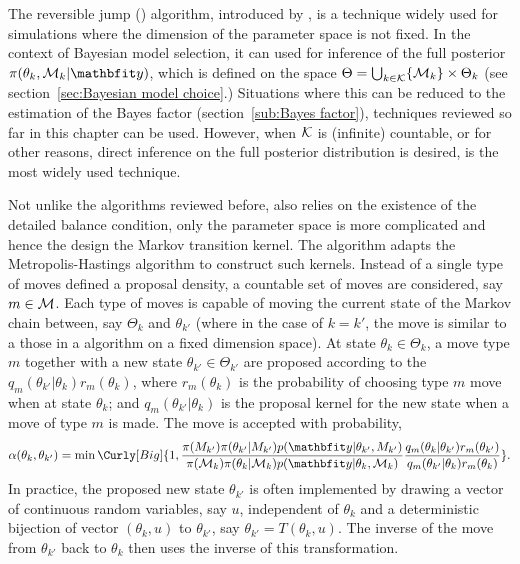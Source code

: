 The reversible jump \mcmc (\rjmcmc) algorithm, introduced by
\cite{Green:1995dg}, is a technique widely used for simulations where the
dimension of the parameter space is not fixed. In the context of Bayesian
model selection, it can used for inference of the full posterior
$\pi(\theta_k,\calM_k|\data)$, which is defined on the space $\Theta =
\bigcup_{k\in\mathcal{K}}\{\mathcal{M}_k\}\times\Theta_k$ (see section~\ref{sec:Bayesian
  model choice}.) Situations where this can be reduced to the estimation of
the Bayes factor (section~\ref{sub:Bayes factor}), techniques reviewed so far
in this chapter can be used. However, when $\mathcal{K}$ is (infinite) countable, or
for other reasons, direct inference on the full posterior distribution is
desired, \rjmcmc is the most widely used technique.

Not unlike the \mcmc algorithms reviewed before, \rjmcmc also relies on the
existence of the detailed balance condition, only the parameter space is more
complicated and hence the design the Markov transition kernel. The \rjmcmc
algorithm adapts the Metropolis-Hastings algorithm to construct such kernels.
Instead of a single type of moves defined a proposal density, a countable set
of moves are considered, say $m\in\mathcal{M}$. Each type of moves is capable of
moving the current state of the Markov chain between, say $\Theta_k$ and
$\theta_{k'}$ (where in the case of $k = k'$, the move is similar to a those
in a \mcmc algorithm on a fixed dimension space). At state
$\theta_k\in\Theta_k$, a move type $m$ together with a new state
$\theta_{k'}\in\Theta_{k'}$ are proposed according to the
$q_m(\theta_{k'}|\theta_k)r_m(\theta_k)$, where $r_m(\theta_k)$ is the
probability of choosing type $m$ move when at state $\theta_k$; and
$q_m(\theta_{k'}|\theta_k)$ is the proposal kernel for the new state when a move
of type $m$ is made. The move is accepted with probability,
\begin{equation}
  \alpha(\theta_k,\theta_{k'}) =
  \min\Curly[Big]{1,
    \frac{\pi(M_{k'})\pi(\theta_{k'}|M_{k'})p(\data|\theta_{k'},M_{k'})}
    {\pi(\calM_k)\pi(\theta_k|\calM_k)p(\data|\theta_k,\calM_k)}
    \frac{q_m(\theta_k|\theta_{k'})r_m(\theta_{k'})}
    {q_m(\theta_{k'}|\theta_k)r_m(\theta_k)}
  }.
\end{equation}
In practice, the proposed new state $\theta_{k'}$ is often implemented by
drawing a vector of continuous random variables, say $u$, independent of
$\theta_k$ and a deterministic bijection of vector $(\theta_k,u)$ to
$\theta_{k'}$, say $\theta_{k'} = T(\theta_k,u)$. The inverse of the move from
$\theta_{k'}$ back to $\theta_k$ then uses the inverse of this transformation.

